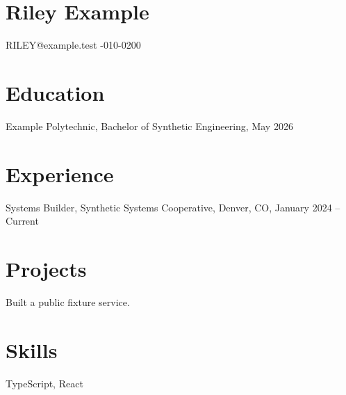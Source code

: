 \documentclass{article}
\begin{document}
\section*{Riley Example}
RILEY@example.test -010-0200
\section*{Education}
Example Polytechnic, Bachelor of Synthetic Engineering, May 2026
\section*{Experience}
Systems Builder, Synthetic Systems Cooperative, Denver, CO, January 2024 -- Current
\section*{Projects}
Built a public fixture service.
\section*{Skills}
TypeScript, React
\end{document}
